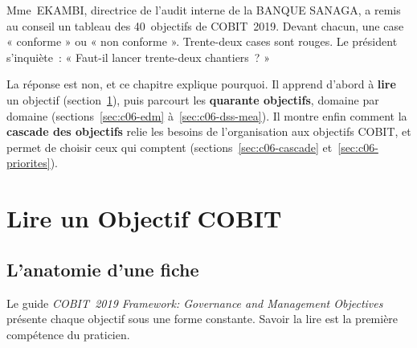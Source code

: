Mme~EKAMBI, directrice de l'audit interne de la BANQUE SANAGA, a remis au
conseil un tableau des 40~objectifs de COBIT~2019. Devant chacun, une case
« conforme » ou « non conforme ». Trente-deux cases sont rouges. Le
président s'inquiète~: « Faut-il lancer trente-deux chantiers~? »

La réponse est non, et ce chapitre explique pourquoi. Il apprend d'abord à
\textbf{lire} un objectif (section~\ref{sec:c06-lire}), puis parcourt les
\textbf{quarante objectifs}, domaine par domaine
(sections~\ref{sec:c06-edm} à~\ref{sec:c06-dss-mea}). Il montre enfin
comment la \textbf{cascade des objectifs} relie les besoins de
l'organisation aux objectifs COBIT, et permet de choisir ceux qui comptent
(sections~\ref{sec:c06-cascade} et~\ref{sec:c06-priorites}).

\separateur

\section{Lire un Objectif COBIT}
\label{sec:c06-lire}

\subsection{L'anatomie d'une fiche}

Le guide \textit{COBIT~2019 Framework: Governance and Management
Objectives}~\cite{isaca2018cobitobjectifs} présente chaque objectif sous
une forme constante. Savoir la lire est la première compétence du
praticien.

